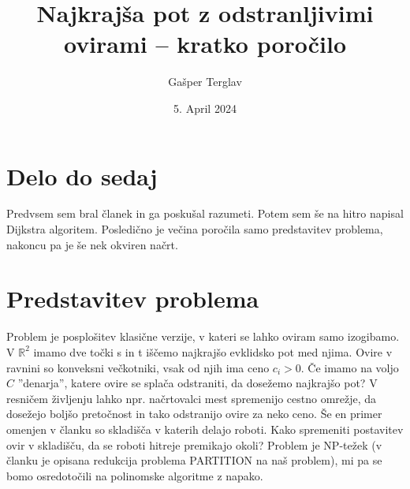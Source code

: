 \documentclass{article}
\author{Gašper Terglav}
\date{5. April 2024}
\title{Najkrajša pot z odstranljivimi ovirami -- kratko poročilo}
\begin{document}
\maketitle

\section*{Delo do sedaj}

Predvsem sem bral članek in ga poskušal razumeti. Potem sem še na hitro napisal Dijkstra algoritem. Posledično je večina poročila samo predstavitev problema, nakoncu pa je še nek okviren načrt.

\section*{Predstavitev problema}

Problem je posplošitev klasične verzije, v kateri se lahko oviram samo izogibamo. V $\mathbb{R}^2$ imamo dve točki s in t iščemo najkrajšo evklidsko pot med njima. Ovire v ravnini so konveksni večkotniki, vsak od njih ima ceno $c_i > 0$. Če imamo na voljo $C$ ''denarja'', katere ovire se splača odstraniti, da dosežemo najkrajšo pot? V resničem življenju lahko npr. načrtovalci mest spremenijo cestno omrežje, da dosežejo boljšo pretočnost in tako odstranijo ovire za neko ceno. Še en primer omenjen v članku so skladišča v katerih delajo roboti. Kako spremeniti postavitev ovir v skladišču, da se roboti hitreje premikajo okoli? Problem je NP-težek (v članku je opisana redukcija problema PARTITION na naš problem), mi pa se bomo osredotočili na polinomske algoritme z napako.


\end{document}
